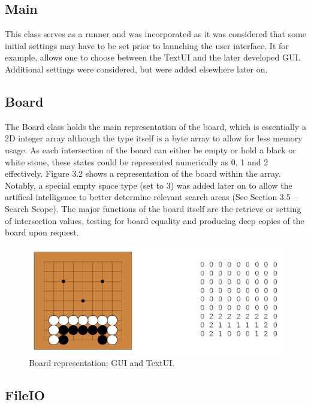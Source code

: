 \documentclass{l3proj}
\begin{document}
\subsection{Main}

This class serves as a runner and was incorporated as it was considered that some initial settings may have to be set prior to launching the user interface. It for example, allows one to choose between the TextUI and the later developed GUI. Additional settings were considered, but were added elsewhere later on.

\subsection{Board}

The Board class holds the main representation of the board, which is essentially a 2D integer array although the type itself is a byte array to allow for less memory usage. As each intersection of the board can either be empty or hold a black or white stone, these states could be represented numerically as 0, 1 and 2 effectively. Figure 3.2 shows a representation of the board within the array. Notably, a special empty space type (set to 3) was added later on to allow the artifical intelligence to better determine relevant search areas (See Section 3.5 – Search Scope). The major functions of the board itself are the retrieve or setting of intersection values, testing for board equality and producing deep copies of the board upon request. 

\begin{figure}[H]
\centering
\includegraphics[scale=1]{Images/GE-BoardRep.png}
\caption{Board representation: GUI and TextUI.}
\end{figure}

\subsection{FileIO}
\end{document}
